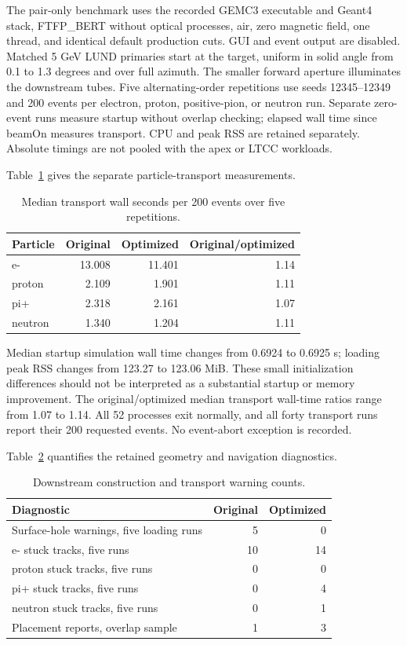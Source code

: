 The pair-only benchmark uses the recorded GEMC3 executable and Geant4 stack, FTFP\_BERT without optical
processes, air, zero magnetic field, one thread, and identical default production cuts. GUI and event output
are disabled. Matched 5 GeV LUND primaries start at the target, uniform in solid angle from 0.1 to 1.3
degrees and over full azimuth. The smaller forward aperture illuminates the downstream tubes. Five
alternating-order repetitions use seeds 12345--12349 and 200 events per electron, proton, positive-pion, or
neutron run. Separate zero-event runs measure startup without overlap checking; elapsed wall time since
beamOn measures transport. CPU and peak RSS are retained separately. Absolute timings are not pooled with
the apex or LTCC workloads.

Table~\ref{tab:downstream-timing} gives the separate particle-transport measurements.

\begin{table}[htbp]
\centering
\caption{Median transport wall seconds per 200 events over five repetitions.}
\label{tab:downstream-timing}
\begin{tabular}{lrrr}
\toprule
Particle & Original & Optimized & Original/optimized \\
\midrule
e- & 13.008 & 11.401 & 1.14 \\
proton & 2.109 & 1.901 & 1.11 \\
pi+ & 2.318 & 2.161 & 1.07 \\
neutron & 1.340 & 1.204 & 1.11 \\
\bottomrule
\end{tabular}
\end{table}

Median startup simulation wall time changes from 0.6924 to 0.6925 s; loading peak RSS changes from 123.27 to
123.06 MiB. These small initialization differences should not be interpreted as a substantial startup or
memory improvement. The original/optimized median transport wall-time ratios range from 1.07 to 1.14. All 52
processes exit normally, and all forty transport runs report their 200 requested events. No event-abort
exception is recorded.

Table~\ref{tab:downstream-warnings} quantifies the retained geometry and navigation diagnostics.

\begin{table}[htbp]
\centering
\caption{Downstream construction and transport warning counts.}
\label{tab:downstream-warnings}
\begin{tabular}{lrr}
\toprule
Diagnostic & Original & Optimized \\
\midrule
Surface-hole warnings, five loading runs & 5 & 0 \\
e- stuck tracks, five runs & 10 & 14 \\
proton stuck tracks, five runs & 0 & 0 \\
pi+ stuck tracks, five runs & 0 & 4 \\
neutron stuck tracks, five runs & 0 & 1 \\
Placement reports, overlap sample & 1 & 3 \\
\bottomrule
\end{tabular}
\end{table}

